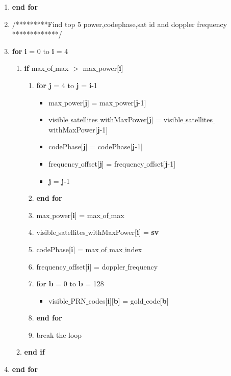 \documentclass[journal,10pt,onecolumn]{article}
\begin{document}
\begin{enumerate}
\begin{enumerate}
    \end{enumerate}
    \item[] \textbf{end for}
    \item[] /*********Find top 5 power,codephase,sat id and doppler frequency *************/
    \item[] \textbf{for} \textbf{i} = 0 to \textbf{i} = 4
    \begin{enumerate}
        \item[] \textbf{if} max$\_$of$\_$max  $>$ max$\_$power[\textbf{i}]
        \begin{enumerate}
            \item[] \textbf{for} \textbf{j} = 4 to \textbf{j} = \textbf{i}-1
            \begin{itemize}
                \item[] max$\_$power[\textbf{j}] = max$\_$power[\textbf{j}-1]
                \item[] visible$\_$satellites$\_$withMaxPower[\textbf{j}] = visible$\_$satellites$\_$withMaxPower[\textbf{j}-1]
                \item[] codePhase[\textbf{j}] = codePhase[\textbf{j}-1]
                \item[]  frequency$\_$offset[\textbf{j}] = frequency$\_$offset[\textbf{j}-1]
                \item[] \textbf{j} = \textbf{j}-1
            \end{itemize} 
            \item[] \textbf{end for}
            \item[] max$\_$power[\textbf{i}] =  max$\_$of$\_$max 
            \item[] visible$\_$satellites$\_$withMaxPower[\textbf{i}] = \textbf{sv}
            \item[]  codePhase[\textbf{i}] = max$\_$of$\_$max$\_$index
            \item[]   frequency$\_$offset[\textbf{i}] = doppler$\_$frequency
            \item[] \textbf{for} \textbf{b} = 0 to \textbf{b} = 128
            \begin{itemize}
                \item[] visible$\_$PRN$\_$codes[\textbf{i}][\textbf{b}] = gold$\_$code[\textbf{b}]
            \end{itemize}
            \item[] \textbf{end for}
            \item[] break the loop
        \end{enumerate}
        \item[] \textbf{end if}
    \end{enumerate}
    \item[] \textbf{end for}



\end{enumerate}
\end{document}
